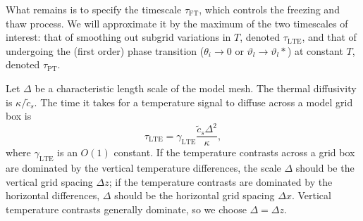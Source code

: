 \documentclass[twoside,10pt]{report}
\begin{document}
What remains is to specify the timescale $\tau_{\mathrm{FT}}$, which controls the freezing and thaw process. We will approximate it by the maximum of the two timescales of interest: that of smoothing out subgrid variations in $T$, denoted $\tau_{\mathrm{LTE}}$, and that of undergoing the (first order) phase transition ($\theta_i \rightarrow 0$ or $\vartheta_l \rightarrow \vartheta_l*$) at constant $T$, denoted $\tau_{\mathrm{PT}}$.

 Let $\Delta$ be a characteristic length scale of the model mesh. The thermal diffusivity is $\kappa/\tilde c_s$. The time it takes for a temperature signal to diffuse across a model grid box is
\begin{equation}\label{e:LTE}
    \tau_{\mathrm{LTE}} = \gamma_{\mathrm{LTE}} \frac{\tilde{c}_s \Delta^2}{\kappa},
\end{equation}
where $\gamma_{\mathrm{LTE}}$ is an $O(1)$ constant. If the temperature contrasts across a grid box are dominated by the vertical temperature differences, the scale $\Delta$ should be the vertical grid spacing $\Delta z$; if the temperature contrasts are dominated by the horizontal differences, $\Delta$ should be the horizontal grid spacing $\Delta x$. Vertical temperature contrasts generally dominate, so we choose $\Delta = \Delta z$.
\end{document}
